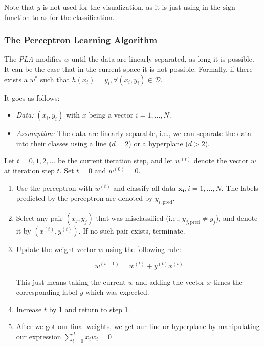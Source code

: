 Note that \(y\) is not used for the visualization, as it is just using in the \(\text{sign}\) function to as for the classification. 

\subsubsection{The Perceptron Learning Algorithm}

The \emph{PLA} modifies \(w\) until the data are linearly separated, as long it is possible. 
It can be the case that in the current space it is not possible. Formally, if there exists a \(w^*\) such that 
\(h(x_i) = y_i, \forall (x_i, y_i) \in \mathcal{D}\).

It goes as follows: 

\begin{itemize}

    \item \emph{Data:} \((x_i, y_i)\) with \(x\) being a vector \(i = 1, \ldots, N\).
    
    \item \emph{Assumption:} The data are linearly separable, i.e., we can separate the data into their classes using a line (\(d = 2\)) or a hyperplane (\(d > 2\)).

\end{itemize}

Let \(t = 0, 1, 2, \ldots\) be the current iteration step, and let \(w^{(t)}\) denote the vector \(w\) at iteration step \(t\).  
Set \(t = 0\) and \(w^{(0)} = 0\).

\begin{enumerate}

    \item Use the perceptron with \(w^{(t)}\) and classify all data \(\mathbf{x_i}, i = 1, \ldots, N\). The labels predicted by the perceptron are denoted by \(y_{i,\text{pred}}\).
    
    \item Select any pair \((x_j, y_j)\) that was misclassified (i.e., \(y_{j,\text{pred}} \neq y_j\)), and denote it by \((x^{(t)}, y^{(t)})\). If no such pair exists, terminate.
    
    \item Update the weight vector \(w\) using the following rule:
    
        \[
            w^{(t+1)} = w^{(t)} + y^{(t)} x^{(t)}
        \]

        This just means taking the current \(w\) and adding the vector \(x\) times the corresponding label \(y\) which was expected.
         
    \item Increase \(t\) by 1 and return to step 1.
    
    \item After we got our final weights, we get our line or hyperplane by manipulating our 
    expression \(\sum_{i = 0}^d x_i w_i = 0\)

\end{enumerate}

